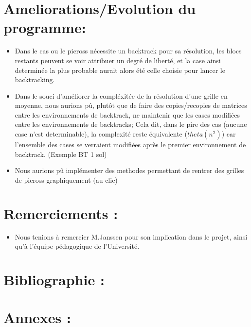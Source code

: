\documentclass{article}
\begin{document}
\section{Ameliorations/Evolution du programme:}
\begin{itemize}
\item Dans le cas ou le picross nécessite un backtrack pour sa résolution, les blocs restants peuvent se voir attribuer un degré de liberté, et la case ainsi determinée la plus probable aurait alors été celle choisie pour lancer le backtracking.
\item Dans le souci d'améliorer la compléxitée de la résolution d'une grille en moyenne, nous aurions pû, plutôt que de faire des copies/recopies de matrices entre les environnements de backtrack, ne maintenir que les cases modifiées entre les environnements de backtracks;
Cela dit, dans le pire des cas (aucune case n'est determinable), la complexité reste équivalente ($theta(n^2)$) car l'ensemble des cases se verraient modifiées après le premier environnement de backtrack. (Exemple BT 1 sol)
\item Nous aurions pû implémenter des methodes permettant de rentrer des grilles de picross graphiquement (au clic)
\end{itemize}
\section{Remerciements :}
\begin{itemize}
\item Nous tenions à remercier M.Janssen pour son implication dans le projet, ainsi qu'à l'équipe pédagogique de l'Université.
\end{itemize}
\section{Bibliographie :}
\section{Annexes :}
\end{document}

